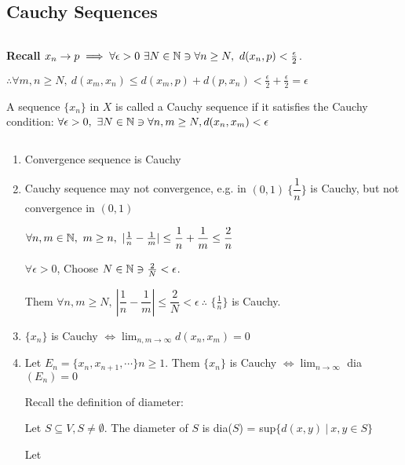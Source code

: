 \subsection{Cauchy Sequences} $ $

\textbf{Recall} $x_n \rightarrow p \implies \forall \epsilon > 0 ~\exists N \in \mathbb{N} \ni \forall n \geq N ,~d(x_n,p) < \frac{\epsilon}{2}$.

$\therefore \forall m,n \geq N, ~d(x_m,x_n) \leq d(x_m,p) + d(p,x_n) < \frac{\epsilon}{2} + \frac{\epsilon}{2} = \epsilon$

\begin{defn}
	A sequence $\{x_n\}$ in $X$ is called a Cauchy sequence if it satisfies the Cauchy condition: $\forall \epsilon > 0,~\exists N \in \mathbb{N} \ni \forall n,m \geq N, d(x_n,x_m) < \epsilon$
\end{defn}

\newpage

\begin{rmk*}$ $
	\begin{enumerate}[label = (\roman*), wide]
		\item Convergence sequence is Cauchy
		\item Cauchy sequence may not convergence, e.g. in $(0,1)~\{\dfrac{1}{n}\}$ is Cauchy, but not convergence in $(0,1)$
		\begin{tcolorbox}
			$\forall n,m \in \mathbb{N} ,~ m \geq n,~ |\frac{1}{n} - \frac{1}{m}| \leq \dfrac{1}{n} + \dfrac{1}{m} \leq \dfrac{2}{n}$
			
			$\forall \epsilon > 0$, Choose $N \in \mathbb{N} \ni \frac{2}{N} < \epsilon$. 
			
			Them $\forall n,m \geq N,~|\dfrac{1}{n} - \dfrac{1}{m} | \leq \dfrac{2}{N} < \epsilon ~ \therefore$ $\{\frac{1}{n}\}$ is Cauchy.
		\end{tcolorbox}
		\item $\{x_n\}$ is Cauchy $\Leftrightarrow \lim_{n,m \rightarrow \infty} d(x_n,x_m) = 0$
		
		\item Let $E_n = \{x_n , x_{n+1} , \cdots\} n \geq 1$. Them $\{x_n\}$ is Cauchy $\Leftrightarrow \lim_{n \rightarrow \infty} $ dia $(E_n) = 0$
		
		
		
		\begin{tcolorbox}
			Recall the definition of diameter:

			Let $S \subseteq V, S \neq \emptyset.$ The diameter of $S$ is dia($S$) = sup$\{d(x,y)~|~ x,y \in S\}$

			Let  
		\end{tcolorbox}
		
		
	\end{enumerate}
\end{rmk*}


